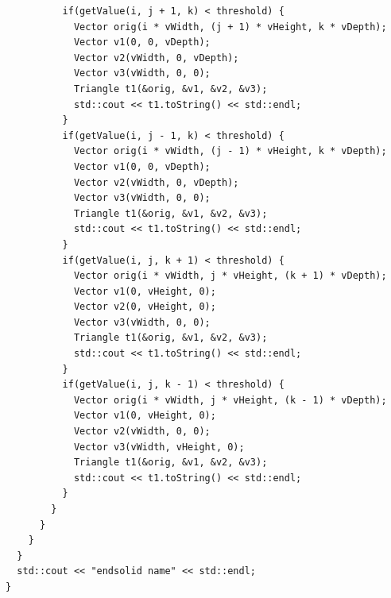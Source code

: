 \documentclass [a4 paper,11pt]{report}
\begin{document}
\begin{lstlisting}
          if(getValue(i, j + 1, k) < threshold) {
            Vector orig(i * vWidth, (j + 1) * vHeight, k * vDepth);
            Vector v1(0, 0, vDepth);
            Vector v2(vWidth, 0, vDepth);
            Vector v3(vWidth, 0, 0);
            Triangle t1(&orig, &v1, &v2, &v3);
            std::cout << t1.toString() << std::endl;
          }
          if(getValue(i, j - 1, k) < threshold) {
            Vector orig(i * vWidth, (j - 1) * vHeight, k * vDepth);
            Vector v1(0, 0, vDepth);
            Vector v2(vWidth, 0, vDepth);
            Vector v3(vWidth, 0, 0);
            Triangle t1(&orig, &v1, &v2, &v3);
            std::cout << t1.toString() << std::endl;
          }
          if(getValue(i, j, k + 1) < threshold) {
            Vector orig(i * vWidth, j * vHeight, (k + 1) * vDepth);
            Vector v1(0, vHeight, 0);
            Vector v2(0, vHeight, 0);
            Vector v3(vWidth, 0, 0);
            Triangle t1(&orig, &v1, &v2, &v3);
            std::cout << t1.toString() << std::endl;
          }
          if(getValue(i, j, k - 1) < threshold) {
            Vector orig(i * vWidth, j * vHeight, (k - 1) * vDepth);
            Vector v1(0, vHeight, 0);
            Vector v2(vWidth, 0, 0);
            Vector v3(vWidth, vHeight, 0);
            Triangle t1(&orig, &v1, &v2, &v3);
            std::cout << t1.toString() << std::endl;
          }
        }
      }
    }
  }
  std::cout << "endsolid name" << std::endl;
}
\end{lstlisting}
\end{document}
